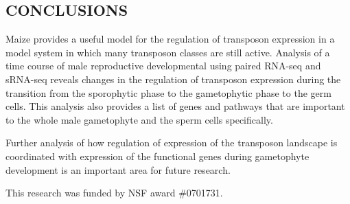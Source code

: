 \documentclass[a0,30pt]{sciposter}
\begin{document}
\begin{multicols}{3}
  
  \section*{CONCLUSIONS}

  Maize provides a useful model for the regulation of transposon expression in a model system in which many transposon classes are still active.
  Analysis of a time course of male reproductive developmental using paired RNA-seq and sRNA-seq reveals changes in the regulation of transposon expression during the transition from the
  sporophytic phase to the gametophytic phase to the germ cells.  This analysis also provides a list of genes and pathways that are important to the whole male
  gametophyte and the sperm cells specifically.

  Further analysis of how regulation of expression of the transposon landscape is coordinated with expression of the
  functional genes during gametophyte development is an important area for future research.
  

  \nocite{*} %


  {\small\color{CarnegiePriBrown} This research was funded by NSF award \#0701731.}

\end{multicols}
\end{document}
